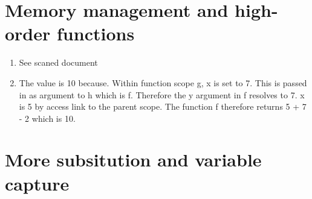 \documentclass{article}
\begin{document}
\section{Memory management and high-order functions}
	\begin{enumerate}
		\item See scaned document

		\item The value is 10 because. Within function scope g, x is set to 7. This
			is passed in as argument to h which is f. Therefore the y argument in f
			resolves to 7. x is 5 by access link to the parent scope. The function f
			therefore returns 5 + 7 - 2 which is 10.

	\end{enumerate}

\section{More subsitution and variable capture}
\end{document}
